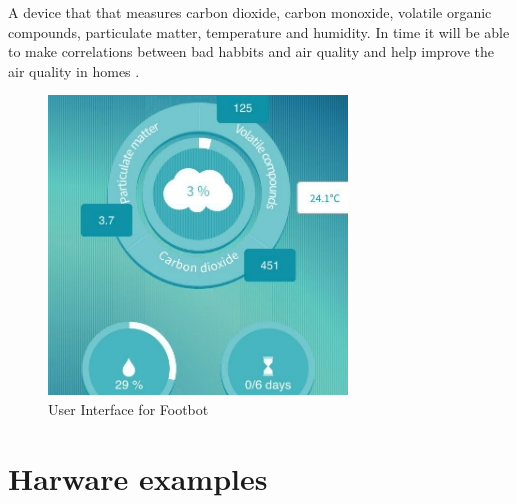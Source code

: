 \documentclass[12pt]{article}
\begin{document}
A device that that measures carbon dioxide, carbon monoxide, volatile organic compounds, particulate matter, temperature and humidity. In time it will be able to make correlations between bad habbits and air quality and help improve the air quality in homes \cite{air}.
\begin{figure}
\caption{User Interface for Footbot}
\includegraphics{ai}

\end{figure}

 \section {Harware examples}
\end{document}
